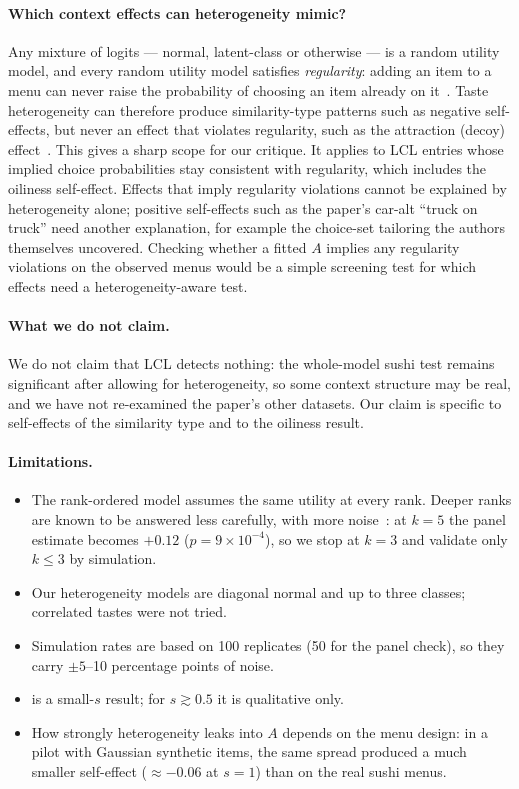 \documentclass[11pt,a4paper]{article}
\theoremstyle{remark}
\begin{document}
\paragraph{Which context effects can heterogeneity mimic?}
Any mixture of logits --- normal, latent-class or otherwise --- is a random utility model, and every random
utility model satisfies \emph{regularity}: adding an item to a menu can never raise the probability of
choosing an item already on it~\cite{bm60}. Taste heterogeneity can therefore produce similarity-type
patterns such as negative self-effects, but never an effect that violates regularity, such as the
attraction (decoy) effect~\cite{hpp82}. This gives a sharp scope for our critique. It applies to LCL entries
whose implied choice probabilities stay consistent with regularity, which includes the oiliness self-effect.
Effects that imply regularity violations cannot be explained by heterogeneity alone; positive self-effects
such as the paper's car-alt ``truck on truck'' need another explanation, for example the choice-set
tailoring the authors themselves uncovered. Checking whether a fitted $A$ implies any regularity
violations on the observed menus would be a simple screening test for which effects need a
heterogeneity-aware test.

\paragraph{What we do not claim.}
We do not claim that LCL detects nothing: the whole-model sushi test remains significant after allowing
for heterogeneity, so some context structure may be real, and we have not re-examined the paper's other
datasets. Our claim is specific to self-effects of the similarity type and to the oiliness result.

\paragraph{Limitations.}
\begin{itemize}
\item The rank-ordered model assumes the same utility at every rank. Deeper ranks are known to be answered
      less carefully, with more noise~\cite{hr87}: at $k=5$ the panel estimate becomes $+0.12$
      ($p=9\times10^{-4}$), so we stop at $k=3$ and validate only $k\le3$ by simulation.
\item Our heterogeneity models are diagonal normal and up to three classes; correlated tastes were not
      tried.
\item Simulation rates are based on 100 replicates (50 for the panel check), so they carry
      $\pm5$--10 percentage points of noise.
\item {} is a small-$s$ result; for $s\gtrsim0.5$ it is qualitative only.
\item How strongly heterogeneity leaks into $A$ depends on the menu design: in a pilot with Gaussian
      synthetic items, the same spread produced a much smaller self-effect ($\approx-0.06$ at $s=1$) than
      on the real sushi menus.
\end{itemize}
\end{document}
